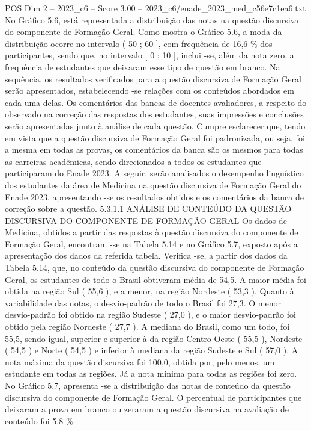 \begin{textsample}{POS Dim 2 – 2023\_c6 – Score 3.00 – 2023\_c6/enade\_2023\_med\_c56e7c1ea6.txt}
No Gráfico 5.6, está representada a distribuição das notas na questão discursiva do componente de Formação Geral.
Como mostra o Gráfico 5.6, a moda da distribuição ocorre no intervalo ( 50 ; 60 ], com frequência de 16,6 \% dos participantes, sendo que, no intervalo [ 0 ; 10 ], inclui -se, além da nota zero, a frequência de estudantes que deixaram esse tipo de questão em branco.
Na sequência, os resultados verificados para a questão discursiva de Formação Geral serão apresentados, estabelecendo -se relações com os conteúdos abordados em cada uma delas.
Os comentários das bancas de docentes avaliadores, a respeito do observado na correção das respostas dos estudantes, suas impressões e conclusões serão apresentadas junto à análise de cada questão.
Cumpre esclarecer que, tendo em vista que a questão discursiva de Formação Geral foi padronizada, ou seja, foi a mesma em todas as provas, os comentários da banca são os mesmos para todas as carreiras acadêmicas, sendo direcionados a todos os estudantes que participaram do Enade 2023.
A seguir, serão analisados o desempenho linguístico dos estudantes da área de Medicina na questão discursiva de Formação Geral do Enade 2023, apresentando -se os resultados obtidos e os comentários da banca de correção sobre a questão. 5.3.1.1 ANÁLISE DE CONTEÚDO DA QUESTÃO DISCURSIVA DO COMPONENTE DE FORMAÇÃO GERAL Os dados de Medicina, obtidos a partir das respostas à questão discursiva do componente de Formação Geral, encontram -se na Tabela 5.14 e no Gráfico 5.7, exposto após a apresentação dos dados da referida tabela.
Verifica -se, a partir dos dados da Tabela 5.14, que, no conteúdo da questão discursiva do componente de Formação Geral, os estudantes de todo o Brasil obtiveram média de 54,5.
A maior média foi obtida na região Sul ( 55,6 ), e a menor, na região Nordeste ( 53,3 ).
Quanto à variabilidade das notas, o desvio-padrão de todo o Brasil foi 27,3.
O menor desvio-padrão foi obtido na região Sudeste ( 27,0 ), e o maior desvio-padrão foi obtido pela região Nordeste ( 27,7 ).
A mediana do Brasil, como um todo, foi 55,5, sendo igual, superior e superior à da região Centro-Oeste ( 55,5 ), Nordeste ( 54,5 ) e Norte ( 54,5 ) e inferior à mediana da região Sudeste e Sul ( 57,0 ).
A nota máxima da questão discursiva foi 100,0, obtida por, pelo menos, um estudante em todas as regiões.
Já a nota mínima para todas as regiões foi zero.
No Gráfico 5.7, apresenta -se a distribuição das notas de conteúdo da questão discursiva do componente de Formação Geral.
O percentual de participantes que deixaram a prova em branco ou zeraram a questão discursiva na avaliação de conteúdo foi 5,8 \%.

\end{textsample}
